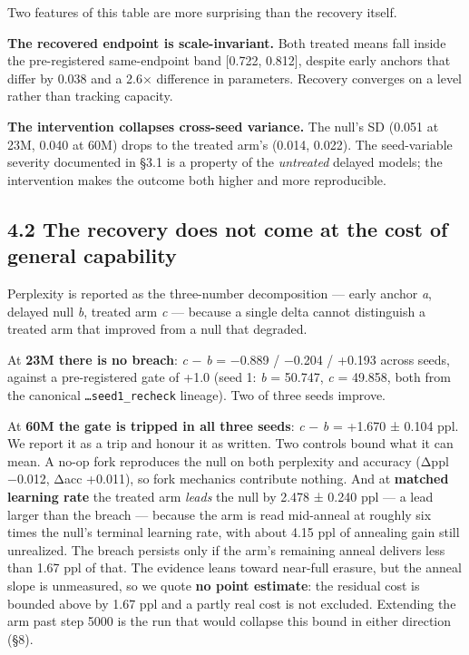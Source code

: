\documentclass{article}
\begin{document}
Two features of this table are more surprising than the recovery itself.

\textbf{The recovered endpoint is scale-invariant.} Both treated means fall inside the
pre-registered same-endpoint band {[}0.722, 0.812{]}, despite early anchors that differ by
0.038 and a 2.6× difference in parameters. Recovery converges on a level rather than
tracking capacity.

\textbf{The intervention collapses cross-seed variance.} The null's SD (0.051 at 23M, 0.040 at
60M) drops to the treated arm's (0.014, 0.022). The seed-variable severity documented in
§3.1 is a property of the \emph{untreated} delayed models; the intervention makes the outcome
both higher and more reproducible.

\subsection{4.2 The recovery does not come at the cost of general capability}\label{the-recovery-does-not-come-at-the-cost-of-general-capability}

Perplexity is reported as the three-number decomposition --- early anchor \emph{a}, delayed null
\emph{b}, treated arm \emph{c} --- because a single delta cannot distinguish a treated arm that
improved from a null that degraded.

At \textbf{23M there is no breach}: \emph{c} − \emph{b} = −0.889 / −0.204 / +0.193 across seeds, against a
pre-registered gate of +1.0 (seed 1: \emph{b} = 50.747, \emph{c} = 49.858, both from the canonical
\texttt{…seed1\_recheck} lineage). Two of three seeds improve.

At \textbf{60M the gate is tripped in all three seeds}: \emph{c} − \emph{b} = +1.670 ± 0.104 ppl. We report
it as a trip and honour it as written. Two controls bound what it can mean. A no-op fork
reproduces the null on both perplexity and accuracy (Δppl −0.012, Δacc +0.011), so fork
mechanics contribute nothing. And at \textbf{matched learning rate} the treated arm \emph{leads} the
null by 2.478 ± 0.240 ppl --- a lead larger than the breach --- because the arm is read
mid-anneal at roughly six times the null's terminal learning rate, with about 4.15 ppl of
annealing gain still unrealized. The breach persists only if the arm's remaining anneal
delivers less than 1.67 ppl of that. The evidence leans toward near-full erasure, but the
anneal slope is unmeasured, so we quote \textbf{no point estimate}: the residual cost is bounded
above by 1.67 ppl and a partly real cost is not excluded. Extending the arm past step 5000
is the run that would collapse this bound in either direction (§8).
\end{document}
